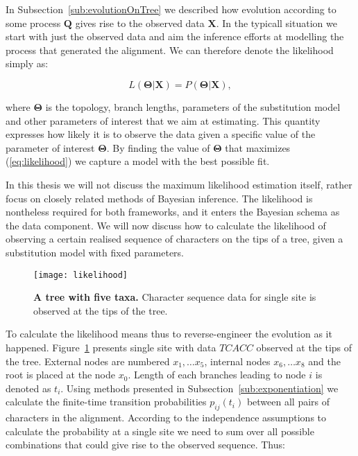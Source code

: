 In Subsection~\ref{sub:evolutionOnTree} we described how evolution according to some process $\mathbf{Q}$ gives rise to the observed data $\mathbf{X}$.
In the typicall situation we start with just the observed data and aim the inference efforts at modelling the process that generated the alignment.
We can therefore denote the likelihood simply as: 

\begin{equation}
L\left(\mathbf{\Theta}|\mathbf{X}\right)=P\left(\mathbf{\Theta}|\mathbf{X}\right), 
\label{eq:likelihood}
\end{equation}

\noindent
where $\mathbf{\Theta}$ is the topology, branch lengths, parameters of the substitution model and other parameters of interest that we aim at estimating.
This quantity expresses how likely it is to observe the data given a specific value of the parameter of interest $\mathbf{\Theta}$.
By finding the value of $\mathbf{\Theta}$ that maximizes (\ref{eq:likelihood}) we capture a model with the best possible fit.

In this thesis we will not discuss the maximum likelihood estimation itself, rather focus on closely related methods of Bayesian inference.
The likelihood is nontheless required for both frameworks, and it enters the Bayesian schema as the data component.
We will now discuss how to calculate the likelihood of observing a certain realised sequence of characters on the tips of a tree, given a substitution model with fixed parameters.

\begin{figure}[H]
\centering
\texttt{[image: likelihood]} 
\caption{
{ \footnotesize 
{\bf  A tree with five taxa.} Character sequence data for single site is observed at the tips of the tree.
} %
}
\label{fig:LIKELIHOOD}
\end{figure}

To calculate the likelihood means thus to reverse-engineer the evolution as it happened.
Figure~\ref{fig:LIKELIHOOD} presents single site with data $TCACC$ observed at the tips of the tree.
External nodes are numbered $x_{1}, \ldots x_{5}$, internal nodes $x_{6}, \ldots x_{8}$ and the root is placed at the node $x_{0}$.
Length of each branches leading to node $i$ is denoted as $t_{i}$.
Using methods presented in Subsection~\ref{sub:exponentiation} we calculate the finite-time transition probabilities $p_{ij}(t_{i})$ between all pairs of characters in the alignment.
According to the independence assumptions to calculate the probability at a single site we need to sum over all possible combinations that could give rise to the observed sequence. Thus:


